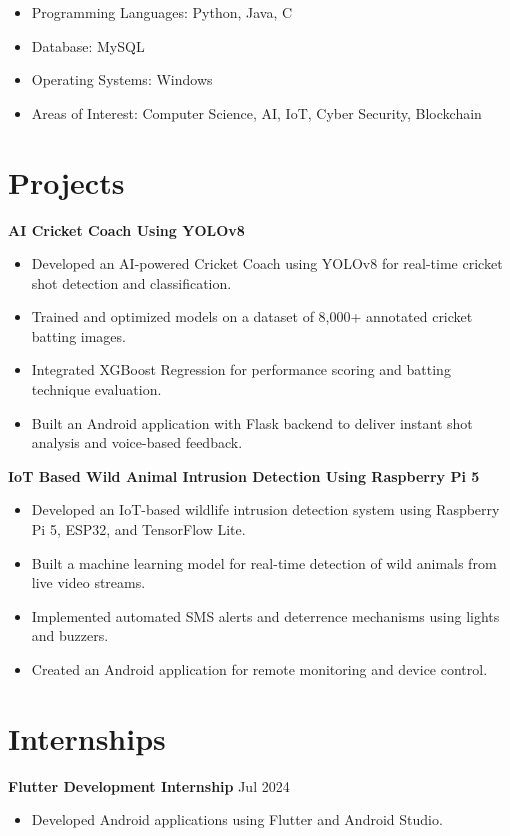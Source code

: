 \documentclass[a4paper,10pt]{article}
\begin{document}
\begin{itemize}
\item Programming Languages: Python, Java, C
\item Database: MySQL
\item Operating Systems: Windows
\item Areas of Interest: Computer Science, AI, IoT, Cyber Security, Blockchain
\end{itemize}

\section*{Projects}

\textbf{AI Cricket Coach Using YOLOv8}
\begin{itemize}
\item Developed an AI-powered Cricket Coach using YOLOv8 for real-time cricket shot detection and classification.
\item Trained and optimized models on a dataset of 8,000+ annotated cricket batting images.
\item Integrated XGBoost Regression for performance scoring and batting technique evaluation.
\item Built an Android application with Flask backend to deliver instant shot analysis and voice-based feedback.
\end{itemize}

\textbf{IoT Based Wild Animal Intrusion Detection Using Raspberry Pi 5}
\begin{itemize}
\item Developed an IoT-based wildlife intrusion detection system using Raspberry Pi 5, ESP32, and TensorFlow Lite.
\item Built a machine learning model for real-time detection of wild animals from live video streams.
\item Implemented automated SMS alerts and deterrence mechanisms using lights and buzzers.
\item Created an Android application for remote monitoring and device control.
\end{itemize}

\section*{Internships}

\textbf{Flutter Development Internship} \hfill Jul 2024
\begin{itemize}
\item Developed Android applications using Flutter and Android Studio.
\end{itemize}
\end{document}
